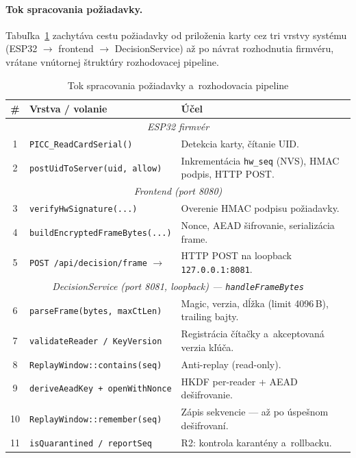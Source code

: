\documentclass[a4paper]{feidipsp}
\begin{document}
\paragraph{Tok spracovania požiadavky.}
Tabuľka~\ref{t:request-flow} zachytáva cestu požiadavky od priloženia karty cez tri vrstvy systému (ESP32 $\rightarrow$ frontend $\rightarrow$ DecisionService) až po návrat rozhodnutia firmvéru, vrátane vnútornej štruktúry rozhodovacej pipeline.

\begin{table}[!htbp]
\caption{Tok spracovania požiadavky a~rozhodovacia pipeline}\label{t:request-flow}
\centering
\footnotesize
\renewcommand{\arraystretch}{1.1}
\begin{tabular}{|c|l|p{5.5cm}|} \hline
\textbf{\#} & \textbf{Vrstva / volanie} & \textbf{Účel} \\ \hline
\multicolumn{3}{|c|}{\emph{ESP32 firmvér}} \\ \hline
1 & \texttt{PICC\_ReadCardSerial()} & Detekcia karty, čítanie UID. \\ \hline
2 & \texttt{postUidToServer(uid, allow)} & Inkrementácia \texttt{hw\_seq} (NVS), HMAC podpis, HTTP POST. \\ \hline
\multicolumn{3}{|c|}{\emph{Frontend (port 8080)}} \\ \hline
3 & \texttt{verifyHwSignature(...)} & Overenie HMAC podpisu požiadavky. \\ \hline
4 & \texttt{buildEncryptedFrameBytes(...)} & Nonce, AEAD šifrovanie, serializácia frame. \\ \hline
5 & \texttt{POST /api/decision/frame} $\longrightarrow$ & HTTP POST na loopback \texttt{127.0.0.1:8081}. \\ \hline
\multicolumn{3}{|c|}{\emph{DecisionService (port 8081, loopback) --- \texttt{handleFrameBytes}}} \\ \hline
6 & \texttt{parseFrame(bytes, maxCtLen)} & Magic, verzia, dĺžka (limit 4096\,B), trailing bajty. \\ \hline
7 & \texttt{validateReader / KeyVersion} & Registrácia čítačky a~akceptovaná verzia kľúča. \\ \hline
8 & \texttt{ReplayWindow::contains(seq)} & Anti-replay (read-only). \\ \hline
9 & \texttt{deriveAeadKey + openWithNonce} & HKDF per-reader + AEAD dešifrovanie. \\ \hline
10 & \texttt{ReplayWindow::remember(seq)} & Zápis sekvencie --- až po úspešnom dešifrovaní. \\ \hline
11 & \texttt{isQuarantined / reportSeq} & R2: kontrola karantény a~rollbacku. \\ \hline

\end{tabular}
\end{table}
\end{document}
